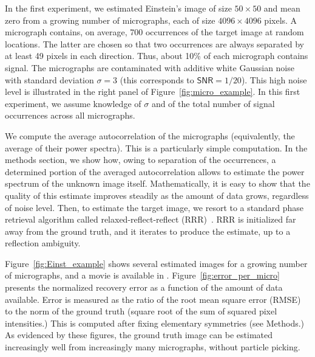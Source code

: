\documentclass[english,11pt]{article}
\newcommand{\1}{\mathbf{1}}
\newcommand{\TODO}[1]{{\color{red}{[#1]}}}
\numberwithin{equation}{section}
\theoremstyle{plain}
\theoremstyle{definition}
\theoremstyle{remark}
\theoremstyle{plain}
\theoremstyle{remark}
\theoremstyle{plain}
\theoremstyle{plain}
\newcommand{\SNR}{\ensuremath{\textsf{SNR}}}
\begin{document}
In the first experiment, we estimated Einstein's image of size $50\times 50$ and mean zero from a growing number of micrographs, each of size $4096\times 4096$ pixels. A micrograph contains, on average, 700 occurrences of the target image at random locations. The latter are chosen so that two occurrences are always separated by at least 49 pixels in each direction. \TODO{it is not clear at this point why the separation is needed. Maybe comment about this, or at least mention that the separation condition is discussed later on.} Thus, about 10\% of each micrograph contains signal. The micrographs are contaminated with additive white Gaussian noise with standard deviation $\sigma=3$ (this corresponds to $\SNR=1/20$). This high noise level is illustrated in the right panel of Figure~\ref{fig:micro_example}. In this first experiment, we assume knowledge of $\sigma$ and of the total number of signal occurrences across all micrographs.\TODO{Need to mention that in the 3-D reconstruction we do not make these assumptions.}

We compute the average autocorrelation of the micrographs (equivalently, the average of their power spectra). This is a particularly simple computation. In the methods section, we show how, owing to separation of the occurrences, a determined portion of the averaged autocorrelation allows to estimate the power spectrum of the unknown image itself. Mathematically, it is easy to show that the quality of this estimate improves steadily as the amount of data grows, regardless of noise level. Then, to estimate the target image, we resort to a standard phase retrieval algorithm called relaxed-reflect-reflect (RRR)~\cite{elser2017rrr}. %
RRR is initialized far away from the ground truth, and it iterates to produce the estimate, up to a reflection ambiguity.

Figure~\ref{fig:Einst_example} shows several estimated images for a growing number of micrographs, and a movie is available in \TODO{supplementary material}. Figure~\ref{fig:error_per_micro} presents the normalized recovery error as a function of the amount of data available. Error is measured as the ratio of the root mean square error (RMSE) to the norm of the ground truth (square root of the sum of squared pixel intensities.) This is computed after fixing elementary symmetries (see Methods.) As evidenced by these figures, the ground truth image can be estimated increasingly well from increasingly many micrographs, without particle picking.

\TODO{Here the cryo-EM setup shows up}
\end{document}
